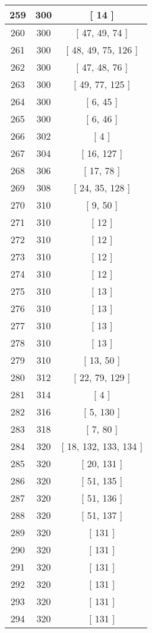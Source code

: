 \begin{center}
\begin{longtable}[H]{|| c c c ||}
\\\hline
259 & 300 & [ 14 ]
\\\hline
260 & 300 & [ 47, 49, 74 ]
\\\hline
261 & 300 & [ 48, 49, 75, 126 ]
\\\hline
262 & 300 & [ 47, 48, 76 ]
\\\hline
263 & 300 & [ 49, 77, 125 ]
\\\hline
264 & 300 & [ 6, 45 ]
\\\hline
265 & 300 & [ 6, 46 ]
\\\hline
266 & 302 & [ 4 ]
\\\hline
267 & 304 & [ 16, 127 ]
\\\hline
268 & 306 & [ 17, 78 ]
\\\hline
269 & 308 & [ 24, 35, 128 ]
\\\hline
270 & 310 & [ 9, 50 ]
\\\hline
271 & 310 & [ 12 ]
\\\hline
272 & 310 & [ 12 ]
\\\hline
273 & 310 & [ 12 ]
\\\hline
274 & 310 & [ 12 ]
\\\hline
275 & 310 & [ 13 ]
\\\hline
276 & 310 & [ 13 ]
\\\hline
277 & 310 & [ 13 ]
\\\hline
278 & 310 & [ 13 ]
\\\hline
279 & 310 & [ 13, 50 ]
\\\hline
280 & 312 & [ 22, 79, 129 ]
\\\hline
281 & 314 & [ 4 ]
\\\hline
282 & 316 & [ 5, 130 ]
\\\hline
283 & 318 & [ 7, 80 ]
\\\hline
284 & 320 & [ 18, 132, 133, 134 ]
\\\hline
285 & 320 & [ 20, 131 ]
\\\hline
286 & 320 & [ 51, 135 ]
\\\hline
287 & 320 & [ 51, 136 ]
\\\hline
288 & 320 & [ 51, 137 ]
\\\hline
289 & 320 & [ 131 ]
\\\hline
290 & 320 & [ 131 ]
\\\hline
291 & 320 & [ 131 ]
\\\hline
292 & 320 & [ 131 ]
\\\hline
293 & 320 & [ 131 ]
\\\hline
294 & 320 & [ 131 ]
\\\hline

\end{longtable}
\end{center}
